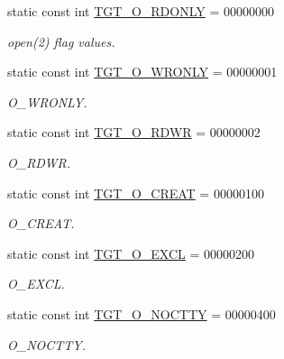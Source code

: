 \begin{Indent}{\bf }\par
{\em \label{_amgrpd41d8cd98f00b204e9800998ecf8427e}
 }\begin{DoxyCompactItemize}
\item 
static const int \hyperlink{classPowerLinux_ad266b23a0ae07d1833e18bae651f3411}{TGT\_\-O\_\-RDONLY} = 00000000
\begin{DoxyCompactList}\small\item\em open(2) flag values. \item\end{DoxyCompactList}\item 
static const int \hyperlink{classPowerLinux_a6156c069cefe05ce3cce033b2e0c2de2}{TGT\_\-O\_\-WRONLY} = 00000001
\begin{DoxyCompactList}\small\item\em O\_\-WRONLY. \item\end{DoxyCompactList}\item 
static const int \hyperlink{classPowerLinux_ac6fa9ecf5d2f3314f197698f1099e2ac}{TGT\_\-O\_\-RDWR} = 00000002
\begin{DoxyCompactList}\small\item\em O\_\-RDWR. \item\end{DoxyCompactList}\item 
static const int \hyperlink{classPowerLinux_aec02e04ca367e6c3f4b46e4edc12efac}{TGT\_\-O\_\-CREAT} = 00000100
\begin{DoxyCompactList}\small\item\em O\_\-CREAT. \item\end{DoxyCompactList}\item 
static const int \hyperlink{classPowerLinux_a10d5d118d15b51ebdd4b16dc78342d1d}{TGT\_\-O\_\-EXCL} = 00000200
\begin{DoxyCompactList}\small\item\em O\_\-EXCL. \item\end{DoxyCompactList}\item 
static const int \hyperlink{classPowerLinux_adfd4240281579e5f60c5e22c601225d8}{TGT\_\-O\_\-NOCTTY} = 00000400
\begin{DoxyCompactList}\small\item\em O\_\-NOCTTY. \item\end{DoxyCompactList}\item 

\end{DoxyCompactItemize}
\end{Indent}
